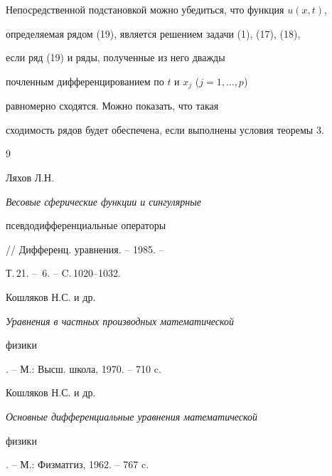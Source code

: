 Непосредственной подстановкой можно убедиться, что функция $u(x,t)$, 


определяемая рядом (19), является решением задачи (1), (17), (18), 


если ряд (19) и ряды, полученные из него дважды


почленным дифференцированием по $t$ и $x_j$ ($j=1,\dotsc,p$)


равномерно сходятся. Можно показать, что такая 


сходимость рядов будет обеспечена, если выполнены условия теоремы 3.





\begin{thebibliography}{9}







Ляхов Л.Н. {\it Весовые сферические функции и сингулярные 


псевдодифференциальные операторы} // Дифференц. уравнения. -- 1985. -- 


Т.\,21. -- \No\,6. -- C.\,1020--1032.




Кошляков Н.С. и др. {\em Уравнения в частных производных математической


физики}. -- М.: Высш. школа, 1970. -- 710 c.




Кошляков Н.С. и др. {\em Основные дифференциальные уравнения математической 


физики}. -- М.: Физматгиз, 1962. -- 767 c.





\end{thebibliography}





\vskip 2cm












\label{end}





